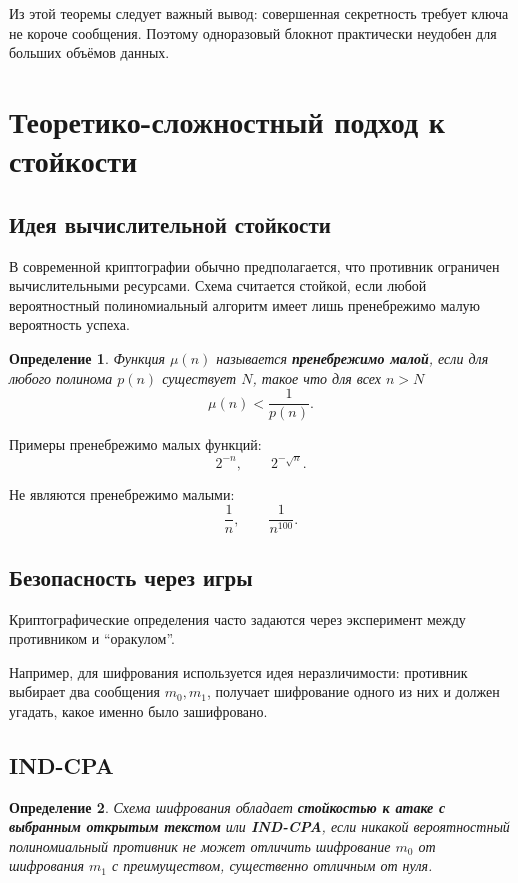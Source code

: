 \documentclass[12pt,a4paper]{article}
\newtheorem{definition}{Определение}
\begin{document}
Из этой теоремы следует важный вывод: совершенная секретность требует ключа не короче сообщения. Поэтому одноразовый блокнот практически неудобен для больших объёмов данных.

\section{Теоретико-сложностный подход к стойкости}

\subsection{Идея вычислительной стойкости}

В современной криптографии обычно предполагается, что противник ограничен вычислительными ресурсами. Схема считается стойкой, если любой вероятностный полиномиальный алгоритм имеет лишь пренебрежимо малую вероятность успеха.

\begin{definition}
Функция $\mu(n)$ называется \textbf{пренебрежимо малой}, если для любого полинома $p(n)$ существует $N$, такое что для всех $n>N$
\[
    \mu(n) < \frac{1}{p(n)}.
\]
\end{definition}

Примеры пренебрежимо малых функций:
\[
    2^{-n},\qquad 2^{-\sqrt n}.
\]

Не являются пренебрежимо малыми:
\[
    \frac{1}{n},\qquad \frac{1}{n^{100}}.
\]

\subsection{Безопасность через игры}

Криптографические определения часто задаются через эксперимент между противником и ``оракулом''.

Например, для шифрования используется идея неразличимости: противник выбирает два сообщения $m_0,m_1$, получает шифрование одного из них и должен угадать, какое именно было зашифровано.

\subsection{IND-CPA}

\begin{definition}
Схема шифрования обладает \textbf{стойкостью к атаке с выбранным открытым текстом} или \textbf{IND-CPA}, если никакой вероятностный полиномиальный противник не может отличить шифрование $m_0$ от шифрования $m_1$ с преимуществом, существенно отличным от нуля.
\end{definition}
\end{document}

